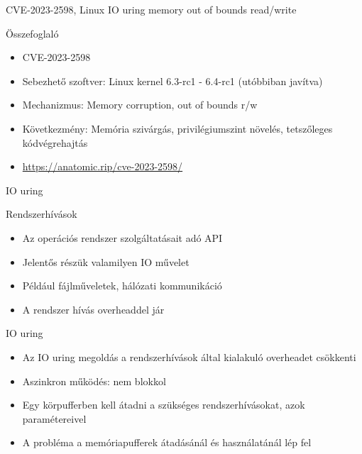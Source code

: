 \documentclass[12 pt]{beamer}
\begin{document}
\begin{frame}{CVE-2023-2598, Linux IO uring memory out of bounds read/write}
  \begin{block}{Összefoglaló}
    \begin{itemize}
      \item{CVE-2023-2598}
      \item{Sebezhető szoftver: Linux kernel 6.3-rc1 - 6.4-rc1 (utóbbiban javítva)}
      \item{Mechanizmus: Memory corruption, out of bounds r/w}
      \item{Következmény: Memória szivárgás, privilégiumszint növelés, tetszőleges kódvégrehajtás}
      \item{\href{https://anatomic.rip/cve-2023-2598/}{https://anatomic.rip/cve-2023-2598/}}
    \end{itemize}
  \end{block}
\end{frame}

\begin{frame}{IO uring}
  \begin{block}{Rendszerhívások}
    \begin{itemize}
      \item{Az operációs rendszer szolgáltatásait adó API}
      \item{Jelentős részük valamilyen IO művelet}
      \item{Például fájlműveletek, hálózati kommunikáció}
      \item{A rendszer hívás overheaddel jár}
    \end{itemize}
  \end{block}
  
  \begin{block}{IO uring}
    \begin{itemize}
      \item{Az IO uring megoldás a rendszerhívások által kialakuló overheadet csökkenti}
      \item{Aszinkron működés: nem blokkol}
      \item{Egy körpufferben kell átadni a szükséges rendszerhívásokat, azok paramétereivel}
      \item{A probléma a memóriapufferek átadásánál és használatánál lép fel}
    \end{itemize}
  \end{block}
\end{frame}
\end{document}
